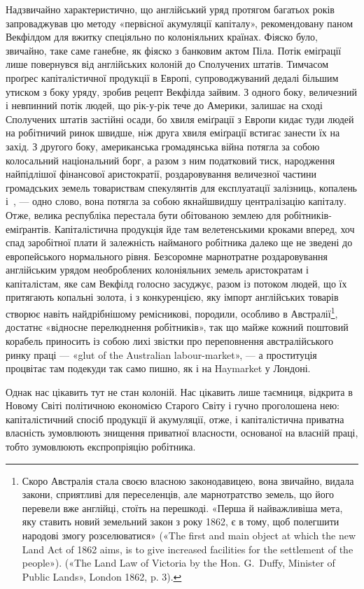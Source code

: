 Надзвичайно характеристично, що англійський уряд протягом багатьох років запроваджував цю методу
«первісної акумуляції капіталу», рекомендовану паном Векфілдом для вжитку спеціяльно по колоніяльних
країнах. Фіяско було, звичайно, таке саме ганебне, як фіяско з банковим актом Піла. Потік еміґрації
лише повернувся від англійських колоній до Сполучених штатів. Тимчасом проґрес капіталістичної
продукції в Европі, супроводжуваний дедалі більшим утиском з боку уряду, зробив рецепт Векфілда
зайвим. З одного боку, величезний і невпинний потік людей, що рік-у-рік тече до Америки, залишає на
сході Сполучених штатів застійні осади, бо хвиля еміґрації з Европи кидає туди людей на робітничий
ринок швидше, ніж друга хвиля еміґрації встигає занести їх на захід. З другого боку, американська
громадянська війна потягла за собою колосальний національний борг, а разом з ним податковий тиск,
народження найпідлішої фінансової аристократії, роздаровування величезної частини громадських земель
товариствам спекулянтів для експлуатації залізниць, копалень і~, — одно слово, вона потягла за
собою якнайшвидшу централізацію капіталу. Отже, велика республіка перестала бути обітованою землею
для робітників-еміґрантів. Капіталістична продукція йде там велетенськими кроками вперед, хоч спад
заробітної плати й залежність найманого робітника далеко ще не зведені до европейського нормального
рівня. Безсоромне марнотратне роздаровування англійським урядом необроблених колоніяльних земель
аристократам і капіталістам, яке сам Векфілд голосно засуджує, разом із потоком людей, що їх
притягають копальні золота, і з конкуренцією, яку імпорт англійських товарів створює навіть
найдрібнішому ремісникові, породили, особливо в Австралії\footnote{
Скоро Австралія стала своєю власною законодавицею, вона звичайно, видала закони, сприятливі для
переселенців, але марнотратство земель, що його перевели вже англійці, стоїть на перешкоді. «Перша й
найважливіша мета, яку ставить новий земельний закон з року
1862, є в тому, щоб полегшити народові змогу розселюватися» («The first and main object at which the
new Land Act of 1862 aims, is to give increased facilities for the settlement of the people»). («The
Land Law of Victoria by the Hon. G.~Duffy, Minister of Public Lands», London 1862, p. 3).
}, достатнє «відносне перелюднення
робітників», так що майже кожний поштовий корабель приносить із собою лихі звістки про
переповнення австралійського ринку праці — «glut of the Australian labour-market», — а проституція
процвітає там подекуди так само пишно, як і на Haymarket у Лондоні.

Однак нас цікавить тут не стан колоній. Нас цікавить лише таємниця, відкрита в Новому Світі
політичною економією Старого Світу і гучно проголошена нею: капіталістичний спосіб продукції й
акумуляції, отже, і капіталістична приватна власність зумовлюють знищення приватної власности,
основаної на власній праці, тобто зумовлюють експропріяцію робітника.
